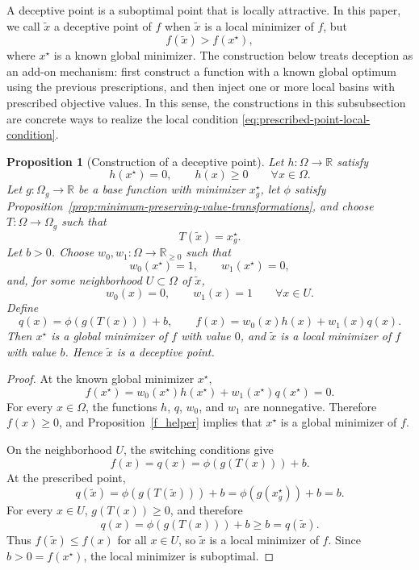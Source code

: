 \documentclass[journal]{IEEEtran}
\theoremstyle{remark}
\theoremstyle{plain}
\newtheorem{proposition}{Proposition}
\begin{document}
A deceptive point is a suboptimal point that is locally attractive. In this
paper, we call \(\tilde x\) a deceptive point of \(f\) when \(\tilde x\) is a
local minimizer of \(f\), but
\[
	f(\tilde x)>f(x^\star),
\]
where \(x^\star\) is a known global minimizer. The construction below treats
deception as an add-on mechanism: first construct a function with a known global
optimum using the previous prescriptions, and then inject one or more local
basins with prescribed objective values. In this sense, the constructions in
this subsubsection are concrete ways to realize the local condition
\eqref{eq:prescribed-point-local-condition}.

\begin{proposition}[Construction of a deceptive point]
	\label{prop:add-on-deceptive-point}
	Let \(h:\Omega\to\mathbb{R}\) satisfy
	\[
	h(x^\star)=0,
	\qquad
	h(x)\ge0
	\qquad
	\forall x\in\Omega.
	\]
	Let \(g:\Omega_g\to\mathbb{R}\) be a base function with minimizer
	\(x_g^\star\), let \(\phi\) satisfy
	Proposition~\ref{prop:minimum-preserving-value-transformations}, and choose
	\(T:\Omega\to\Omega_g\) such that
	\[
	T(\tilde x)=x_g^\star.
	\]
	Let \(b>0\). Choose \(w_0,w_1:\Omega\to\mathbb{R}_{\ge0}\) such that
	\[
	w_0(x^\star)=1,
	\qquad
	w_1(x^\star)=0,
	\]
	and, for some neighborhood \(U\subset\Omega\) of \(\tilde x\),
	\[
	w_0(x)=0,
	\qquad
	w_1(x)=1
	\qquad
	\forall x\in U.
	\]
	Define
	\[
	q(x)=\phi(g(T(x)))+b,
	\qquad
	f(x)=w_0(x)h(x)+w_1(x)q(x).
	\]
	Then \(x^\star\) is a global minimizer of \(f\) with value \(0\), and
	\(\tilde x\) is a local minimizer of \(f\) with value \(b\). Hence
	\(\tilde x\) is a deceptive point.
\end{proposition}

\begin{proof}
	At the known global minimizer \(x^\star\),
	\[
	f(x^\star)
	=
	w_0(x^\star)h(x^\star)+w_1(x^\star)q(x^\star)
	=
	0.
	\]
	For every \(x\in\Omega\), the functions \(h\), \(q\), \(w_0\), and \(w_1\)
	are nonnegative. Therefore \(f(x)\ge0\), and
	Proposition~\ref{f_helper} implies that \(x^\star\) is a global minimizer of
	\(f\).
	
	On the neighborhood \(U\), the switching conditions give
	\[
	f(x)=q(x)=\phi(g(T(x)))+b.
	\]
	At the prescribed point,
	\[
	q(\tilde x)
	=
	\phi(g(T(\tilde x)))+b
	=
	\phi(g(x_g^\star))+b
	=
	b.
	\]
	For every \(x\in U\), \(g(T(x))\ge0\), and therefore
	\[
	q(x)=\phi(g(T(x)))+b\ge b=q(\tilde x).
	\]
	Thus \(f(\tilde x)\le f(x)\) for all \(x\in U\), so \(\tilde x\) is a local
	minimizer of \(f\). Since \(b>0=f(x^\star)\), the local minimizer is
	suboptimal.
\end{proof}
\end{document}
